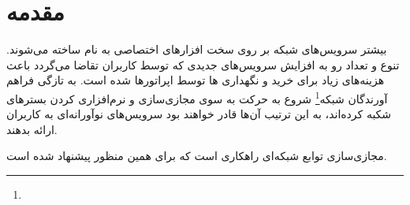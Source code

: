\chapter{مقدمه}


بیشتر سرویس‌های شبکه بر روی سخت افزارهای اختصاصی به نام
ساخته می‌شوند.
تنوع و تعداد رو به افزایش سرویس‌های جدیدی که توسط کاربران تقاضا می‌گردد
باعث هزینه‌های زیاد برای خرید و نگهداری
‌ها
توسط اپراتورها شده است.
به تازگی فراهم آورندگان شبکه\footnote{}
شروع به حرکت به سوی مجازی‌سازی و نرم‌افزاری کردن بسترهای شکبه کرده‌اند،
به این ترتیب آن‌ها قادر خواهند بود
سرویس‌های نوآورانه‌ای به کاربران ارائه بدهند.

مجازی‌سازی توابع شبکه‌ای راهکاری است که برای همین منظور پیشنهاد شده است.